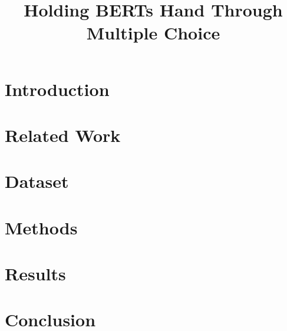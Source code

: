 \documentclass[10pt, a4paper]{article}
\title{Holding BERTs Hand Through Multiple Choice}
\begin{document}
\maketitleabstract

\section{Introduction} \label{intro}


\section{Related Work}
 \label{related-work}

\section{Dataset} \label{dataset}


\section{Methods} \label{approach}


\section{Results} \label{results}


\section{Conclusion}
 \label{conclusion}


 
\end{document}
